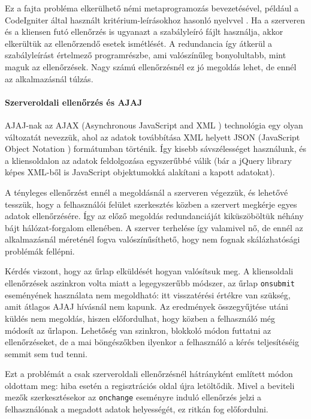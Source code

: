 \documentclass[12pt,a4paper,twoside]{article}
\begin{document}
Ez a fajta probléma elkerülhető némi metaprogramozás bevezetésével, például a
CodeIgniter által használt kritérium-leírásokhoz hasonló nyelvvel
\cite{CI-Val}. Ha a szerveren és a kliensen futó ellenőrzés is ugyanazt a
szabályleíró fájlt használja, akkor elkerültük az ellenőrzendő esetek
ismétlését. A redundancia így átkerül a szabályleírást értelmező programrészbe,
ami valószínűleg bonyolultabb, mint maguk az ellenőrzések. Nagy számú
ellenőrzésnél ez jó megoldás lehet, de ennél az alkalmazásnál túlzás.

\paragraph{Szerveroldali ellenőrzés és AJAJ}
AJAJ-nak az AJAX (Asynchronous JavaScript and XML \cite{ajax}) technológia egy
olyan változatát nevezzük, ahol az adatok továbbítása XML helyett JSON
(JavaScript Object Notation \cite{json}) formátumban történik. Így kisebb
sávszélességet használunk, és a kliensoldalon az adatok feldolgozása egyszerűbbé
válik (bár a jQuery library képes XML-ből is JavaScript objektumokká alakítani a
kapott adatokat).

A tényleges ellenőrzést ennél a megoldásnál a szerveren végezzük, és lehetővé
tesszük, hogy a felhasználói felület szerkesztés közben a szervert megkérje
egyes adatok ellenőrzésére. Így az előző megoldás redundanciáját kiküszöböltük
néhány bájt hálózat-forgalom ellenében. A szerver terhelése így valamivel nő, de
ennél az alkalmazásnál méreténél fogva valószínűsíthető, hogy nem fognak
skálázhatósági problémák fellépni.

Kérdés viszont, hogy az űrlap elküldését hogyan valósítsuk meg.
A kliensoldali ellenőrzések aszinkron volta miatt a legegyszerűbb módszer, az
űrlap \texttt{onsubmit} eseményének használata nem megoldható: itt visszatérési
értékre van szükség, amit átlagos AJAJ hívásnál nem kapunk. Az eredmények
összegyűjtése utáni küldés nem megoldás, hiszen előfordulhat, hogy közben a
felhasználó még módosít az űrlapon. Lehetőség van szinkron, blokkoló módon
futtatni az ellenőrzéseket, de a mai böngészőkben ilyenkor a felhasználó a kérés
teljesítéséig semmit sem tud tenni.

Ezt a problémát a csak szerveroldali ellenőrzésnél hátrányként említett módon
oldottam meg: hiba esetén a regisztrációs oldal újra letöltődik. Mivel a
beviteli mezők szerkesztésekor az \texttt{onchange} eseményre induló ellenőrzés
jelzi a felhasználónak a megadott adatok helyességét, ez ritkán fog előfordulni.
\end{document}
